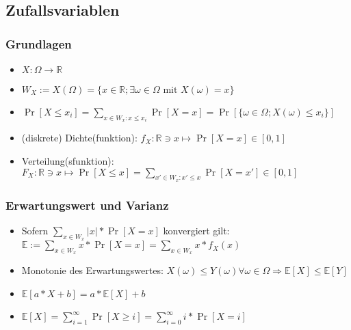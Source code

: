 \subsection{Zufallsvariablen}

\subsubsection{Grundlagen}
\begin{itemize}
\item $X:\Omega\rightarrow\mathbb{R}$
\item $W_X:=X(\Omega)=\{x\in\mathbb{R};\exists\omega\in\Omega\text{ mit } X(\omega)=x\}$
\item $\Pr[X\leq x_i]=\sum_{x\in W_x:x\leq x_i}\Pr[X=x]=\Pr[\{\omega\in\Omega ;X(\omega)\leq x_i\}]$
\item (diskrete) Dichte(funktion): $f_{X}:\mathbb{R}\ni x\mapsto\Pr[X=x]\in[0,1]$
\item Verteilung(sfunktion): $F_X:\mathbb{R}\ni x\mapsto\Pr[X\leq x]=\sum_{x'\in W_x:x'\leq x}\Pr[X=x']\in[0,1]$
\end{itemize}

\subsubsection{Erwartungswert und Varianz}
\begin{itemize}
\item Sofern $\sum_{x\in W_x}|x|*\Pr[X=x]$ konvergiert gilt:\\
	$\mathbb{E}:=\sum_{x\in W_x}x*\Pr[X=x]=\sum_{x\in W_x}x*f_X(x)$
\item Monotonie des Erwartungswertes: $X(\omega)\leq Y(\omega)\forall\omega\in\Omega\Rightarrow \mathbb{E}[X]\leq\mathbb{E}[Y]$
\item $\mathbb{E}[a*X+b]=a*\mathbb{E}[X]+b$
\item $\mathbb{E}[X]=\sum_{i=1}^\infty\Pr[X\geq i]=\sum_{i=0}^\infty i*\Pr[X=i]$
\end{itemize}


